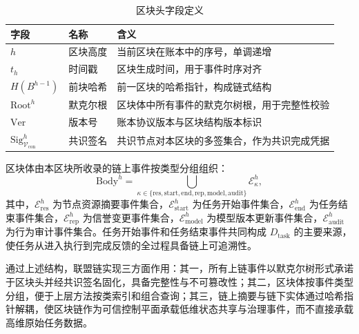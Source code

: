 \begin{table}[htbp]
    \centering
    \caption{区块头字段定义}
    \label{tab:ch3_block_header_fields}
    \begin{tabular}{p{2.0cm}p{3.0cm}p{8.0cm}}
        \toprule
        字段                                            & 名称   & 含义                     \\
        \midrule
        $h$                                           & 区块高度 & 当前区块在账本中的序号，单调递增       \\
        $t_h$                                         & 时间戳  & 区块生成时间，用于事件时序对齐        \\
        $H(B^{h-1})$                                  & 前块哈希 & 前一区块的哈希指针，构成链式结构       \\
        $\mathrm{Root}^h$                             & 默克尔根 & 区块体中所有事件的默克尔树根，用于完整性校验 \\
        $\mathrm{Ver}$                                & 版本号  & 账本协议版本与区块结构版本标识        \\
        $\mathrm{Sig}_{\mathcal{V}_{\mathrm{con}}}^h$ & 共识签名 & 共识节点对本区块的多签集合，作为共识完成凭据 \\
        \bottomrule
    \end{tabular}
\end{table}

区块体由本区块所收录的链上事件按类型分组组织：
\begin{equation}
    \mathrm{Body}^h=\bigcup_{\kappa\in\{\mathrm{res},\mathrm{start},\mathrm{end},\mathrm{rep},\mathrm{model},\mathrm{audit}\}}\mathcal{E}_\kappa^h,
    \label{eq:ch3_block_body}
\end{equation}
其中，$\mathcal{E}_{\mathrm{res}}^h$ 为节点资源摘要事件集合，$\mathcal{E}_{\mathrm{start}}^h$ 为任务开始事件集合，$\mathcal{E}_{\mathrm{end}}^h$ 为任务结束事件集合，$\mathcal{E}_{\mathrm{rep}}^h$ 为信誉变更事件集合，$\mathcal{E}_{\mathrm{model}}^h$ 为模型版本更新事件集合，$\mathcal{E}_{\mathrm{audit}}^h$ 为行为审计事件集合。任务开始事件和任务结束事件共同构成 $D_{\mathrm{task}}$ 的主要来源，使任务从进入执行到完成反馈的全过程具备链上可追溯性。

通过上述结构，联盟链实现三方面作用：其一，所有上链事件以默克尔树形式承诺于区块头并经共识签名固化，具备完整性与不可篡改性；其二，区块体按事件类型分组，便于上层方法按类索引和组合查询；其三，链上摘要与链下实体通过哈希指针解耦，使区块链作为可信控制平面承载低维状态共享与治理事件，而不直接承载高维原始任务数据。

